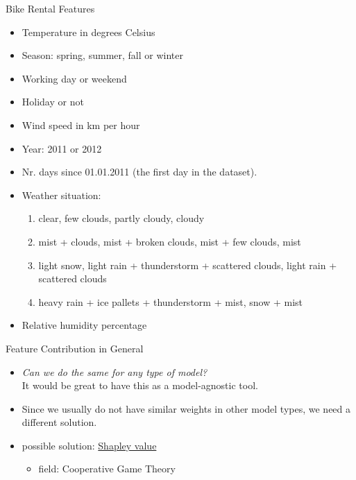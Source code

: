 \documentclass[dvipsnames]{beamer}
\newcommand{\red}[1]{{\color{red} #1}}
\begin{document}
\begin{frame}{Bike Rental Features\footnotemark}
	\begin{itemize}
		\item Temperature in degrees Celsius
		\item Season: spring, summer, fall or winter
		\item Working day or weekend
		\item Holiday or not
		\item Wind speed in km per hour
		\item Year: 2011 or 2012
		\item Nr. days since 01.01.2011 (the first day in the dataset).
		\item Weather situation:
		\begin{enumerate}[a]
			\item clear, few clouds, partly cloudy, cloudy
			\item mist + clouds, mist + broken clouds, mist + few clouds, mist
			\item light snow, light rain + thunderstorm + scattered clouds, light rain + scattered clouds
			\item heavy rain + ice pallets + thunderstorm + mist, snow + mist
		\end{enumerate}
		\item Relative humidity percentage
	\end{itemize}
\end{frame}



\begin{frame}{Feature Contribution in General}
	\begin{itemize}
		\item \emph{Can we do the same for any type of model?}
		\\It would be great to have this as a model-agnostic tool.
		\item \red{Since we usually do not have similar weights in other model types, we need a different solution.}
		\item possible solution: \underline{Shapley value}
		\begin{itemize}
			\item field: Cooperative Game Theory
		\end{itemize}
	\end{itemize}
\end{frame}
\end{document}
